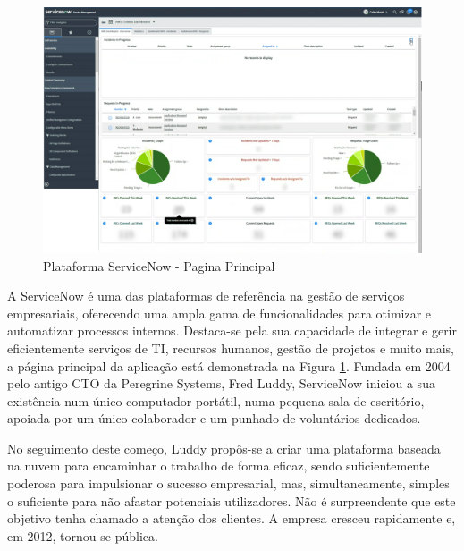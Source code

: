         \begin{figure}[htbp]
            \centering
            \includegraphics[width=\textwidth]{imgs/ServiceNow.png} %
            \caption[Plataforma ServiceNow - Pagina Principal]{Plataforma ServiceNow - Pagina Principal\protect\footnotemark}\label{fig:service-ui}
        \end{figure}

        A ServiceNow é uma das plataformas de referência na gestão de serviços empresariais, oferecendo uma ampla gama de funcionalidades para otimizar e automatizar processos internos. Destaca-se pela sua capacidade de integrar e gerir eficientemente serviços de TI, recursos humanos, gestão de projetos e muito mais, a página principal da aplicação está demonstrada na Figura \ref{fig:service-ui}. Fundada em 2004 pelo antigo CTO da Peregrine Systems, Fred Luddy, ServiceNow iniciou a sua existência num único computador portátil, numa pequena sala de escritório, apoiada por um único colaborador e um punhado de voluntários dedicados.

        No seguimento deste começo, Luddy propôs-se a criar uma plataforma baseada na nuvem para encaminhar o trabalho de forma eficaz, sendo suficientemente poderosa para impulsionar o sucesso empresarial, mas, simultaneamente, simples o suficiente para não afastar potenciais utilizadores. Não é surpreendente que este objetivo tenha chamado a atenção dos clientes. A empresa cresceu rapidamente e, em 2012, tornou-se pública.
        
